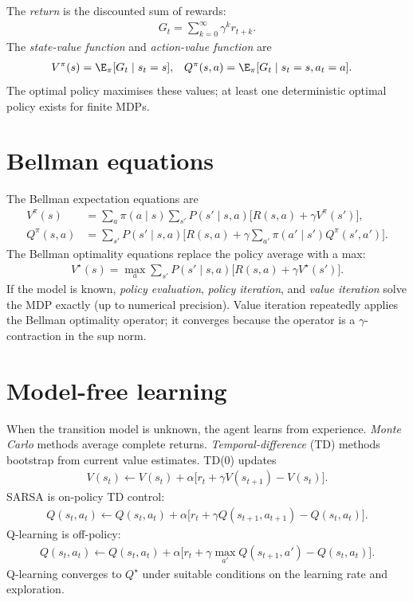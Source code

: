 \documentclass[a4paper, 12pt]{book}
\begin{document}
The \emph{return} is the discounted sum of rewards:
\begin{align}
    G_t = \sum_{k=0}^{\infty}\gamma^k r_{t+k}.
\end{align}
The \emph{state-value function} and \emph{action-value function} are
\begin{align}
    V^\pi(s) &= \E_\pi[G_t\mid s_t=s], &
    Q^\pi(s,a) &= \E_\pi[G_t\mid s_t=s,a_t=a].
\end{align}
The optimal policy maximises these values; at least one deterministic optimal policy
exists for finite MDPs.

\section{Bellman equations}

The Bellman expectation equations are
\begin{align}
    V^\pi(s) &= \sum_a \pi(a\mid s)\sum_{s'}P(s'\mid s,a)
      \big[R(s,a)+\gamma V^\pi(s')\big],\\
    Q^\pi(s,a) &= \sum_{s'}P(s'\mid s,a)
      \big[R(s,a)+\gamma\sum_{a'}\pi(a'\mid s')Q^\pi(s',a')\big].
\end{align}
The Bellman optimality equations replace the policy average with a max:
\begin{align}
    V^\star(s) = \max_a \sum_{s'}P(s'\mid s,a)
    \big[R(s,a)+\gamma V^\star(s')\big].
\end{align}
If the model is known, \emph{policy evaluation}, \emph{policy iteration}, and
\emph{value iteration} solve the MDP exactly (up to numerical precision). Value
iteration repeatedly applies the Bellman optimality operator; it converges because the
operator is a $\gamma$-contraction in the sup norm.

\section{Model-free learning}

When the transition model is unknown, the agent learns from experience.
\emph{Monte Carlo} methods average complete returns. \emph{Temporal-difference} (TD)
methods bootstrap from current value estimates. TD(0) updates
\begin{align}
    V(s_t) \leftarrow V(s_t) + \alpha\big[r_t+\gamma V(s_{t+1})-V(s_t)\big].
\end{align}
SARSA is on-policy TD control:
\begin{align}
    Q(s_t,a_t) \leftarrow Q(s_t,a_t)
    + \alpha\big[r_t+\gamma Q(s_{t+1},a_{t+1})-Q(s_t,a_t)\big].
\end{align}
Q-learning is off-policy:
\begin{align}
    Q(s_t,a_t) \leftarrow Q(s_t,a_t)
    + \alpha\big[r_t+\gamma\max_{a'}Q(s_{t+1},a')-Q(s_t,a_t)\big].
\end{align}
Q-learning converges to $Q^\star$ under suitable conditions on the learning rate and
exploration.
\end{document}
